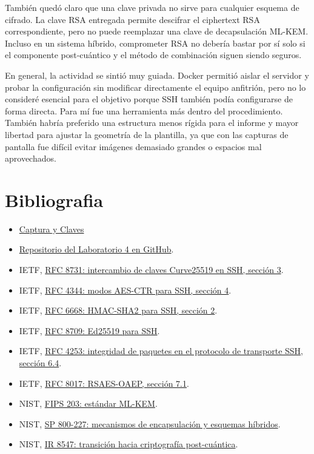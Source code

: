 \documentclass[letter,12pt]{article}
\begin{document}
También quedó claro que una clave privada no sirve para cualquier esquema de cifrado. La
clave RSA entregada permite descifrar el ciphertext RSA correspondiente, pero no puede
reemplazar una clave de decapsulación ML-KEM. Incluso en un sistema híbrido, comprometer RSA
no debería bastar por sí solo si el componente post-cuántico y el método de combinación
siguen siendo seguros.

En general, la actividad se sintió muy guiada. Docker permitió aislar el servidor y probar
la configuración sin modificar directamente el equipo anfitrión, pero no lo consideré
esencial para el objetivo porque SSH también podía configurarse de forma directa. Para mí
fue una herramienta más dentro del procedimiento. También habría preferido una estructura
menos rígida para el informe y mayor libertad para ajustar la geometría de la plantilla, ya
que con las capturas de pantalla fue difícil evitar imágenes demasiado grandes o espacios
mal aprovechados.

\section{Bibliografia}
\thispagestyle{plain}
\begin{itemize}
    \item \href{https://drive.google.com/drive/folders/1rXMp5y9WeBR36iytc4RBaqXKWf3ea-WU} {Captura y Claves}
    \item \href{https://github.com/lavapatos/cripto-labs/tree/main/lab-4}
    {Repositorio del Laboratorio 4 en GitHub}.
    \item IETF, \href{https://www.rfc-editor.org/rfc/rfc8731.html#section-3}
    {RFC 8731: intercambio de claves Curve25519 en SSH, sección 3}.
    \item IETF, \href{https://www.rfc-editor.org/rfc/rfc4344.html#section-4}
    {RFC 4344: modos AES-CTR para SSH, sección 4}.
    \item IETF, \href{https://www.rfc-editor.org/rfc/rfc6668.html#section-2}
    {RFC 6668: HMAC-SHA2 para SSH, sección 2}.
    \item IETF, \href{https://www.rfc-editor.org/rfc/rfc8709.html}
    {RFC 8709: Ed25519 para SSH}.
    \item IETF, \href{https://www.rfc-editor.org/rfc/rfc4253.html#section-6.4}
    {RFC 4253: integridad de paquetes en el protocolo de transporte SSH, sección 6.4}.
    \item IETF, \href{https://www.rfc-editor.org/rfc/rfc8017.html#section-7.1}
    {RFC 8017: RSAES-OAEP, sección 7.1}.
    \item NIST, \href{https://nvlpubs.nist.gov/nistpubs/fips/nist.fips.203.pdf}
    {FIPS 203: estándar ML-KEM}.
    \item NIST, \href{https://nvlpubs.nist.gov/nistpubs/SpecialPublications/NIST.SP.800-227.pdf}
    {SP 800-227: mecanismos de encapsulación y esquemas híbridos}.
    \item NIST, \href{https://nvlpubs.nist.gov/nistpubs/ir/2026/NIST.IR.8547.pdf}
    {IR 8547: transición hacia criptografía post-cuántica}.
\end{itemize}
\end{document}
